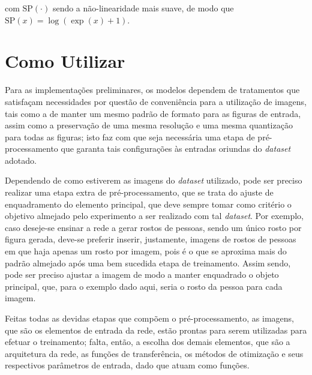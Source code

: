 \noindent com $\text{SP}\left(\cdot\right)$ sendo a não-linearidade mais suave, de modo que $\text{SP}\left(x\right) = \log\left(\exp\left(x\right) +1 \right)$.







\section{Como Utilizar}
\label{sec:gan_for_bss_how_to_use}

Para as implementações preliminares, os modelos dependem de tratamentos que satisfaçam necessidades por questão de conveniência para a utilização de imagens, tais como a de manter um mesmo padrão de formato para as figuras de entrada, assim como a preservação de uma mesma resolução e uma mesma quantização para todas as figuras; isto faz com que seja necessária uma etapa de pré-processamento que garanta tais configurações às entradas oriundas do \textit{dataset} adotado.

Dependendo de como estiverem as imagens do \textit{dataset} utilizado, pode ser preciso realizar uma etapa extra de pré-processamento, que se trata do ajuste de enquadramento do elemento principal, que deve sempre tomar como critério o objetivo almejado pelo experimento a ser realizado com tal \textit{dataset}. Por exemplo, caso deseje-se ensinar a rede a gerar rostos de pessoas, sendo um único rosto por figura gerada, deve-se preferir inserir, justamente, imagens de rostos de pessoas em que haja apenas um rosto por imagem, pois é o que se aproxima mais do padrão almejado após uma bem sucedida etapa de treinamento. Assim sendo, pode ser preciso ajustar a imagem de modo a manter enquadrado o objeto principal, que, para o exemplo dado aqui, seria o rosto da pessoa para cada imagem.

Feitas todas as devidas etapas que compõem o pré-processamento, as imagens, que são os elementos de entrada da rede, estão prontas para serem utilizadas para efetuar o treinamento; falta, então, a escolha dos demais elementos, que são a arquitetura da rede, as funções de transferência, os métodos de otimização e seus respectivos parâmetros de entrada, dado que atuam como funções.



























